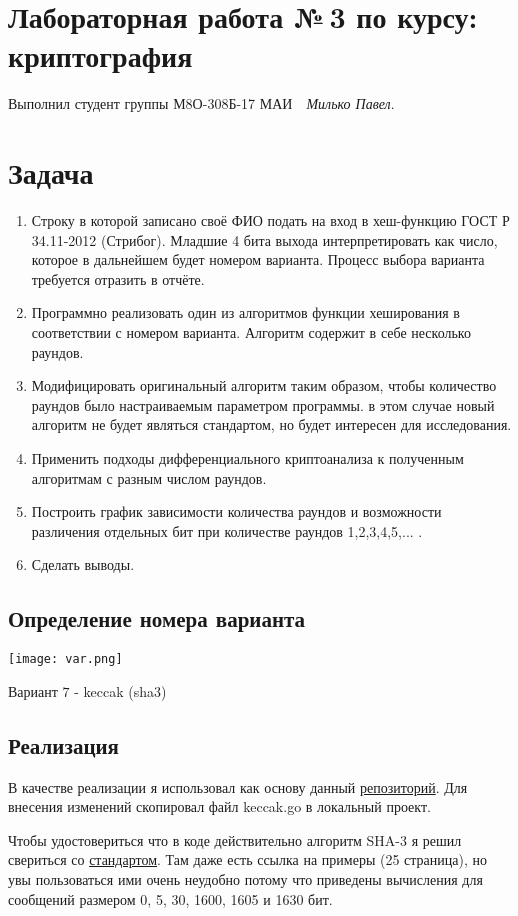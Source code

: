 \documentclass[12pt]{article}
\newcommand{\se}[1]{\section*{\bf #1}}
\newcommand{\pa}[1]{\subsection*{\bf #1}}
\begin{document}
\section*{\centering Лабораторная работа №\,3 по курсу:\\ криптография}

Выполнил студент группы М8О-308Б-17 МАИ \,\, \textit{Милько Павел}.

\se{Задача}

\begin{enumerate}
	\item Строку в которой записано своё ФИО подать на вход в хеш-функцию ГОСТ Р 34.11-2012
	      (Стрибог). Младшие 4 бита выхода интерпретировать как число, которое в дальнейшем будет
	      номером варианта. Процесс выбора варианта требуется отразить в отчёте.
	\item Программно реализовать один из алгоритмов функции хеширования в соответствии с
	      номером варианта. Алгоритм содержит в себе несколько раундов.
	\item Модифицировать оригинальный алгоритм таким образом, чтобы количество раундов
	      было настраиваемым параметром программы. в этом случае новый алгоритм не будет
	      являться стандартом, но будет интересен для исследования.
	\item Применить подходы дифференциального криптоанализа к полученным алгоритмам с
	      разным числом раундов.
	\item Построить график зависимости количества раундов и возможности различения
	      отдельных бит при количестве раундов 1,2,3,4,5,... .
	\item Сделать выводы.
\end{enumerate}

\pa{Определение номера варианта}

\texttt{[image: var.png]}

Вариант $7$ - keccak (sha3)

\pa{Реализация}

В качестве реализации я использовал как основу данный \href{https://github.com/ebfe/keccak}{репозиторий}.
Для внесения изменений скопировал файл keccak.go в локальный проект.

Чтобы удостовериться что в коде действительно алгоритм SHA-3 я решил свериться со
\href{https://nvlpubs.nist.gov/nistpubs/FIPS/NIST.FIPS.202.pdf}{стандартом}.
Там даже есть ссылка на примеры (25 страница), но увы пользоваться ими очень неудобно
потому что приведены вычисления для сообщений размером 0, 5, 30, 1600, 1605 и 1630 бит.
\end{document}
